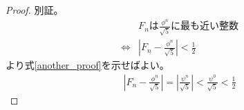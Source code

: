 \documentclass[a4paper,11pt]{jsarticle}
\begin{document}
\begin{proof}
別証。
\begin{align}
&F_nは\frac{\phi^n}{\sqrt{5}}に最も近い整数\\
\Leftrightarrow& \left| F_n - \frac{\phi^n}{\sqrt{5}} \right| < \frac{1}{2}
\label{another_proof}
\end{align}
より式\eqref{another_proof}を示せばよい。
\begin{align}
\left| F_n - \frac{\phi^n}{\sqrt{5}} \right|
= \left| \frac{\psi^n}{\sqrt{5}} \right|
< \frac{\psi^0}{\sqrt{5}}
< \frac{1}{2}
\end{align}

\end{proof}
\end{document}
